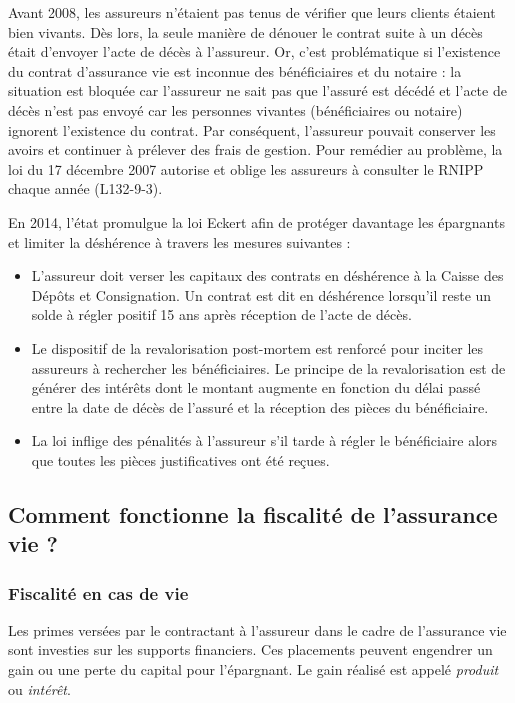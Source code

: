\documentclass{article}
\newcommand{\blackFrame}[2]{
    \begin{tcolorbox}[colback=white,colframe=black!100!white,title={#1}]
        #2
    \end{tcolorbox}
}
\begin{document}
\blackFrame{Zoom historique sur la lutte contre la déshérence des capitaux par l'État}{
Avant 2008, les assureurs n'étaient pas tenus de vérifier que leurs clients étaient bien vivants. Dès lors, la seule manière de dénouer le contrat suite à un décès était d'envoyer l'acte de décès à l'assureur. Or, c'est problématique si l'existence du contrat d'assurance vie est inconnue des bénéficiaires et du notaire : la situation est bloquée car l'assureur ne sait pas que l'assuré est décédé et l'acte de décès n'est pas envoyé car les personnes vivantes (bénéficiaires ou notaire) ignorent l'existence du contrat. Par conséquent, l'assureur pouvait conserver les avoirs et continuer à prélever des frais de gestion. Pour remédier au problème, la loi du 17 décembre 2007 autorise et oblige les assureurs à consulter le RNIPP chaque année (L132-9-3).

En 2014, l'état promulgue la loi Eckert afin de protéger davantage les épargnants et limiter la déshérence à travers les mesures suivantes :

\begin{itemize}
    \item L'assureur doit verser les capitaux des contrats en déshérence à la Caisse des Dépôts et Consignation. Un contrat est dit en déshérence lorsqu'il reste un solde à régler positif 15 ans après réception de l'acte de décès.
    \item Le dispositif de la revalorisation post-mortem est renforcé pour inciter les assureurs à rechercher les bénéficiaires. Le principe de la revalorisation est de générer des intérêts dont le montant augmente en fonction du délai passé entre la date de décès de l'assuré et la réception des pièces du bénéficiaire.
    \item La loi inflige des pénalités à l'assureur s'il tarde à régler le bénéficiaire alors que toutes les pièces justificatives ont été reçues.
\end{itemize}
}

\subsection{Comment fonctionne la fiscalité de l'assurance vie ?}
\subsubsection{Fiscalité en cas de vie}
Les primes versées par le contractant à l'assureur dans le cadre de l'assurance vie sont investies sur les supports financiers.  Ces placements peuvent engendrer un gain ou une perte du capital pour l'épargnant. Le gain réalisé est appelé \textit{produit} ou \textit{intérêt}.
\end{document}
